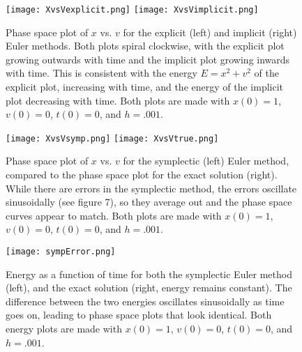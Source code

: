 \documentclass[11pt, oneside]{article}   	%
\begin{document}
\begin{section}
\begin{figure}[H]
\texttt{[image: XvsVexplicit.png]}
\texttt{[image: XvsVimplicit.png]}
\caption{Phase space plot of $x$ vs. $v$ for the explicit (left) and implicit (right) Euler methods. Both plots spiral clockwise, with the explicit plot growing outwards with time and the implicit plot growing inwards with time. This is consistent with the energy $E = x^2 + v^2$ of the explicit plot, increasing with time, and the energy of the implicit plot decreasing with time. Both plots are made with $x(0) = 1$, $v(0) = 0$, $t(0) = 0$, and $h = .001$.}
\end{figure}

\begin{figure}[H]
\texttt{[image: XvsVsymp.png]}
\texttt{[image: XvsVtrue.png]}
\caption{Phase space plot of $x$ vs. $v$ for the symplectic (left) Euler method, compared to the phase space plot for the exact solution (right). While there are errors in the symplectic method, the errors oscillate sinusoidally (see figure 7), so they average out and the phase space curves appear to match. Both plots are made with $x(0) = 1$, $v(0) = 0$, $t(0) = 0$, and $h = .001$.}
\end{figure}

\begin{figure}[H]
\centerline{\texttt{[image: sympError.png]}}
\caption{Energy as a function of time for both the symplectic Euler method (left), and the exact solution (right, energy remains constant). The difference between the two energies oscillates sinusoidally as time goes on, leading to phase space plots that look identical. Both energy plots are made with $x(0) = 1$, $v(0) = 0$, $t(0) = 0$, and $h = .001$.}
\end{figure}

\end{section}
\end{document}
